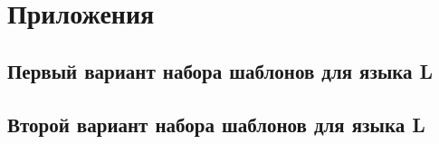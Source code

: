 \setcounter{subsection}{0}
\renewcommand\thesubsection{\Alph{subsection}}

\section*{Приложения}
\subsection{Первый вариант набора шаблонов для языка L}
\label{app:1}


\subsection{Второй вариант набора шаблонов для языка L}
\label{app:2}



\renewcommand\thesubsection{\arabic{section}.\arabic{subsection}}
